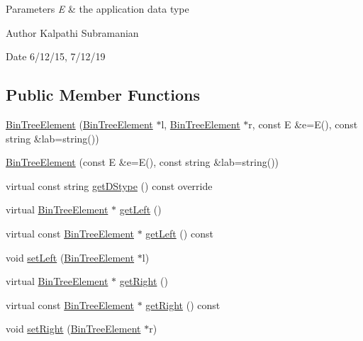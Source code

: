 \begin{DoxyParams}{Parameters}
{\em E} & the application data type\\
\hline
\end{DoxyParams}
\begin{DoxyAuthor}{Author}
Kalpathi Subramanian 
\end{DoxyAuthor}
\begin{DoxyDate}{Date}
6/12/15, 7/12/19 
\end{DoxyDate}
\subsection*{Public Member Functions}
\begin{DoxyCompactItemize}
\item 
\hyperlink{classbridges_1_1datastructure_1_1_bin_tree_element_aaea6c57206cffc0be3204b971fcaf5dd}{Bin\+Tree\+Element} (\hyperlink{classbridges_1_1datastructure_1_1_bin_tree_element}{Bin\+Tree\+Element} $\ast$l, \hyperlink{classbridges_1_1datastructure_1_1_bin_tree_element}{Bin\+Tree\+Element} $\ast$r, const E \&e=E(), const string \&lab=string())
\item 
\hyperlink{classbridges_1_1datastructure_1_1_bin_tree_element_a0f17a369aeb864ea52cfd25ba6b48e89}{Bin\+Tree\+Element} (const E \&e=E(), const string \&lab=string())
\item 
virtual const string \hyperlink{classbridges_1_1datastructure_1_1_bin_tree_element_aef86e3663785972251547e409fdc757b}{get\+D\+Stype} () const override
\item 
virtual \hyperlink{classbridges_1_1datastructure_1_1_bin_tree_element}{Bin\+Tree\+Element} $\ast$ \hyperlink{classbridges_1_1datastructure_1_1_bin_tree_element_ab30cfe373892c52709d5f1df013a0c82}{get\+Left} ()
\item 
virtual const \hyperlink{classbridges_1_1datastructure_1_1_bin_tree_element}{Bin\+Tree\+Element} $\ast$ \hyperlink{classbridges_1_1datastructure_1_1_bin_tree_element_ae14a70e2d25ad62337c87059b0cadb48}{get\+Left} () const
\item 
void \hyperlink{classbridges_1_1datastructure_1_1_bin_tree_element_a3b3caddd57fd31963b248b4dbcf3df27}{set\+Left} (\hyperlink{classbridges_1_1datastructure_1_1_bin_tree_element}{Bin\+Tree\+Element} $\ast$l)
\item 
virtual \hyperlink{classbridges_1_1datastructure_1_1_bin_tree_element}{Bin\+Tree\+Element} $\ast$ \hyperlink{classbridges_1_1datastructure_1_1_bin_tree_element_ae1e6bde8cc03cf5da5a7930354fdf592}{get\+Right} ()
\item 
virtual const \hyperlink{classbridges_1_1datastructure_1_1_bin_tree_element}{Bin\+Tree\+Element} $\ast$ \hyperlink{classbridges_1_1datastructure_1_1_bin_tree_element_a795b1696d628b55dafb2bc1aa961843a}{get\+Right} () const
\item 
void \hyperlink{classbridges_1_1datastructure_1_1_bin_tree_element_a59a1f7bac555e8a9bd88fd4aa1bd9b82}{set\+Right} (\hyperlink{classbridges_1_1datastructure_1_1_bin_tree_element}{Bin\+Tree\+Element} $\ast$r)
\end{DoxyCompactItemize}
